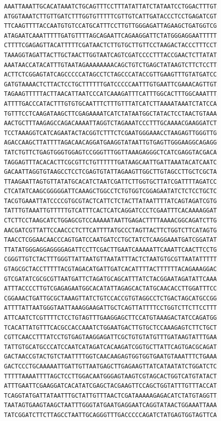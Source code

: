 \documentclass[a4paper]{article}
\begin{document}
\begin{verbatim}
AAATTAAATTGCACATAAATCTGCAGTTTCCTTTATATTATCTATAATCCTGGACTTTGT
ATGGTAAATCTTGTTGATCTTTGGTGTTTTTCGTTGTCATTGATACCCTCCTGAGATCGT
TTCAAGTTTTACCAATGTGTCCATGCATTTCCTTGTTGGGAGATTAGAAGCTGATGGTCG
ATAGAATCAAATTTTTGATGTTTTAGCAGAATTCAGAAGGATTCTATGGGAGGAATTTTT
CTTTTCGAGAGTTACATTTTTCGATAACTCTTGTGCTTGTTCCTAAGACTACCCTTTCCT
TAAAGGTAGATTACTTGCTAACTTGGTAATCAGTCGATCCCCTTTACCGAACTCTTATAT
AAATAACCATACATTTGTAATAGAAAAAAAACAGCTGTCTGAGCTATAAGTCTTCTCCTT
ACTTCTCGGAGTATCAGCCCCCATAGCCTCTAGCCCATACCGTTGAAGTTTGTATGATCC
GATGTAAAACTCTTACTCCTGCTTTTTTGATCCCCCAATTTGTGAATTCGAAACAGTTGT
TAGAAGTTTTTACTTAACATTAATCCCATCAAAGATTTCATTTGGCACTTTGGCAAATTT
ATTTTGACCCATACTTTGTGTGCAATTTCTTTGTTTATCATCTTAAAATAAATCTATCCA
TGTTTCCTCAAGATAAGCTTCGAGAAAATCATCTATAATGGCTATACTCCTAACTGTAAA
AACTGCTTTAAGAGCCAGACAAAATTAGGTCTAGAAATCCCTTTGCAAAACGAAGGATCT
TCCTAAAGGTCATCAGAATACTACGGTCTTTCTCGAATGGGAAACCTAAGAGTTGGGTTG
AGACCAAGCTTATTTTAGACAACAGGATGAAGGTATAATTGTGAGTTGGGAAGGCAGAGG
TATCTGTTCTGAGTGGGTGGAGTCCGGGTTTGGTTAAAGAGGGCTCATCGAGGTACGACA
TAGGAGTTTACACACTTCGCGTTCTGTTTTTTGATAAGCAATTGATTAAATACATCAATC
GACAATTAGGTGTAAGCCTCCTCGAGTGTATTAGAAGTTGGCTTGTAGCCTTGCTCGCTA
TTAAGAATTAGTGTTATATGCACATCTAATCGATTCTTGGTGCTTATCGATTTTAGATCC
CTCATATCAAGCGGGGGATTCAAAGCTGGCCTCTGTGGTCGGAGAATATCTCTCCTGCTC
TACGTGAAATTATCCCCGTGCGTACTCATTCTCTACTTATAATTTTATCAGTAGATCGTG
TATTTGTAAATTGTTTTTGTCATTTCACTCATCAGGATCCCTCGAATTTCACAAAAGGAT
CTCTTCCTAAGCATCTGGAGCGTCCAAAAATAATTGAGACTTTTAAAACGGCAGATCTTG
AACGATCGTTATTCCAACCCTCTTCATTTTATGCCCTAGTTACTTCTGGTCTTCATAGTG
TAACCTCGGAACAACCCAGTGATCCAATGATCCTGCTATCTCAAGGAAATGATCGGATAT
TTATATGGGAGGAGGGGAGATTCCTTCGACTTGAATCAAAAATTCAAATTCAACTTCCTG
CGGGTTGTCTACTTTGGGTTATTAATGTTAATATTTACTCTAATGTGCGTTAATATTTTT
GTAGCGCTACCTTTTTACGTAGACATGATTGATCACATTTTACTTTTTTACAGAAAGGAC
GTCGATATCGCGCGTTAATGATTCTAGATGCAGCATTTATCTACGGAATAGATATTCAAA
ATTTACCCCTTGTCGAGAGAATGGCACATATTAGAGCACTATGCAACACCTTGGATTTCC
CGGAAACTGATTGCGCTAAAGTTATCTGTCCACCGTGTAGGCCTCTGACTAGCATGCCGG
ATTTTATTAATGGGTAATTAAAGGAAGATTGCTCAGTTATTTTCCTGGTCTTCTTCCTTT
ATTCAATCTCGTTTTCTCCTGTAGTTTGAAGGAGCTTCCATGTAAAGACTATCCAGATGG
TCACATTATGTTTCACGCCACCAAATCTGGAATGACTTGTGCTCCAAAGAGTCTTCTGCT
CGTTCAACCTTTATCCTGTGAGTAAGGAGATTCGCTGTGTATGTTTGATAAGTATTTGAA
TATTGTGCATGCCCATCCAATCATAGATCACAAGATCGGTGCTTATTCAGTGACGCAGAT
GACTAACCGTACTGTCTAATTTTGGTCAACAAGAGTGGTGGTGAATGTAAATTTCTGAAA
GACTCCCTGCAAAAATTGATTGTTAATGAGCTTGAGAAGTTATCATAATATCTGGATCTC
TTTTTAAAATTTTAGCTCCTTGGACAATGGGAGTAAGTCGTAGCACTGGTCATGTATACT
ATTTGAATTCGAAGGATCACATATCGAGCTACGAAGTTCCAGCTGGTATTTGTTTACCAT
TCAGGTATGATTATAATTTGCTATTGTTTAACTCGATAAAAAGAGACATCTATGTAGGTT
TAATAGTGAAGTAAGCTAATTTGGGTATGAATGAGGAATCAGGTATAACTGGAAATTAAA
TATCGGATCTTCTTAGCCTAATTGCAGGGTTTGACCCCCAGATCTATGAGTGGTAGTTCA

\end{verbatim}
\end{document}
